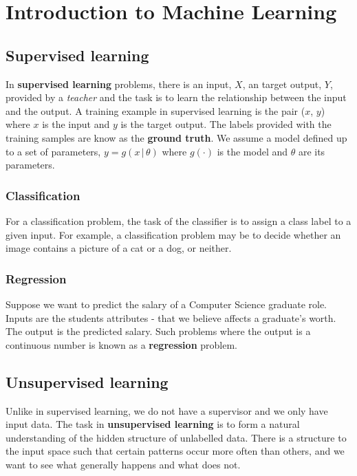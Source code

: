 \documentclass[11pt,fleqn]{book} %
\begin{document}


\chapter{Introduction to Machine Learning}

\section{Supervised learning}
In \textbf{supervised learning} problems, there is an input, $X$, an target output, $Y$, provided by a \textit{teacher} and the task is to learn the relationship between the input and the output. A training example in supervised learning is the pair ($x$, $y$) where $x$ is the input and $y$ is the target output. The labels provided with the training samples are know as the \textbf{ground truth}. We assume a model defined up to a set of parameters, $y = g(x \, \vert \, \theta)$ where $g(\cdot)$ is the model and $\theta$ are its parameters.
\subsection{Classification}
For a classification problem, the task of the classifier is to assign a class label to a given input. For example, a classification problem may be to decide whether an image contains a picture of a cat or a dog, or neither.

\subsection{Regression}
Suppose we want to predict the salary of a Computer Science graduate role. Inputs are the students attributes - that we believe affects a graduate's worth. The output is the predicted salary. Such problems where the output is a continuous number is known as a \textbf{regression} problem.

\section{Unsupervised learning}
Unlike in supervised learning, we do not have a supervisor and we only have input data. The task in \textbf{unsupervised learning} is to form a natural understanding of the hidden structure of unlabelled data. There is a structure to the input space such that certain patterns occur more often than others, and we want to see what generally happens and what does not.
\end{document}
